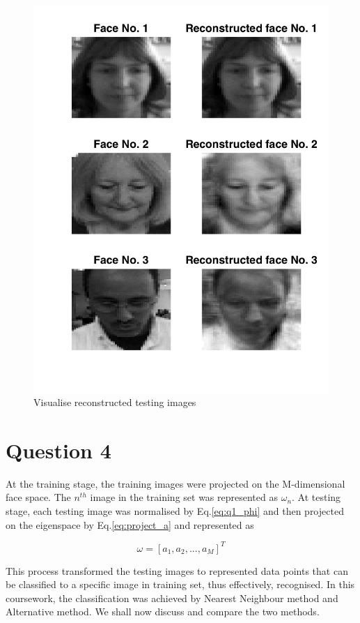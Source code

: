 \documentclass[10pt,twocolumn,letterpaper]{article}
\begin{document}
	
	\begin{figure}
		\begin{center}
			\includegraphics[width=1\linewidth]{q3_rec_test}
			\caption{Visualise reconstructed testing images}
			\label{fig:q3_rec_test}
		\end{center}
	\end{figure}

\section{Question 4}
At the training stage, the training images were projected on the M-dimensional face space. The $n^{th}$ image in the training set was represented  as $\omega_n$. At testing stage, each testing image was normalised by Eq.\ref{eq:q1_phi} and then projected on the eigenspace by Eq.\ref{eq:project_a} and represented as

$$ \omega = [a_1, a_2, ..., a_M]^T$$

This process transformed the testing images to represented data points that can be classified to a specific image in training set, thus effectively, recognised. In this coursework, the classification was achieved by Nearest Neighbour method and Alternative method. We shall now discuss and compare the two methods.
\end{document}
